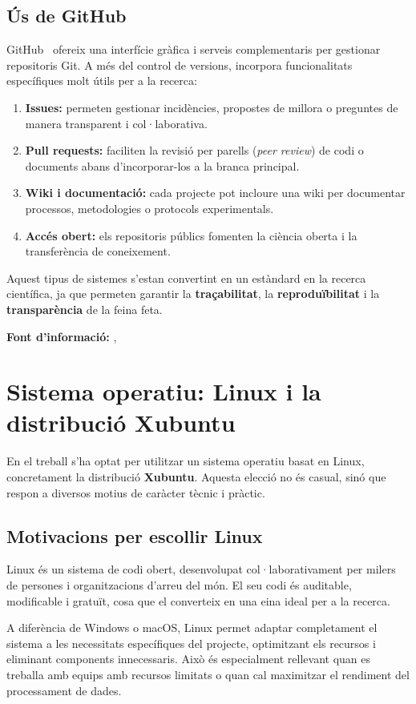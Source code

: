 \subsection{Ús de GitHub}
GitHub~\cite{GitHub} ofereix una interfície gràfica i serveis complementaris per gestionar repositoris Git. A més del control de versions, incorpora funcionalitats específiques molt útils per a la recerca:
\begin{enumerate}
  \item \textbf{Issues:} permeten gestionar incidències, propostes de millora o preguntes de manera transparent i col·laborativa.
  \item \textbf{Pull requests:} faciliten la revisió per parells (\textit{peer review}) de codi o documents abans d’incorporar-los a la branca principal.
  \item \textbf{Wiki i documentació:} cada projecte pot incloure una wiki per documentar processos, metodologies o protocols experimentals.
  \item \textbf{Accés obert:} els repositoris públics fomenten la ciència oberta i la transferència de coneixement.
\end{enumerate}

Aquest tipus de sistemes s’estan convertint en un estàndard en la recerca científica, ja que permeten garantir la \textbf{traçabilitat}, la \textbf{reproduïbilitat} i la \textbf{transparència} de la feina feta.

\textbf{Font d'informació:} \cite{A1}, \cite{A2}
\section{Sistema operatiu: Linux i la distribució Xubuntu}
En el treball s’ha optat per utilitzar un sistema operatiu basat en Linux, concretament la distribució \textbf{Xubuntu}. Aquesta elecció no és casual, sinó que respon a diversos motius de caràcter tècnic i pràctic.

\subsection{Motivacions per escollir Linux}
Linux és un sistema de codi obert, desenvolupat col·laborativament per milers de persones i organitzacions d’arreu del món. El seu codi és auditable, modificable i gratuït, cosa que el converteix en una eina ideal per a la recerca.

A diferència de Windows o macOS, Linux permet adaptar completament el sistema a les necessitats específiques del projecte, optimitzant els recursos i eliminant components innecessaris. Això és especialment rellevant quan es treballa amb equips amb recursos limitats o quan cal maximitzar el rendiment del processament de dades.

